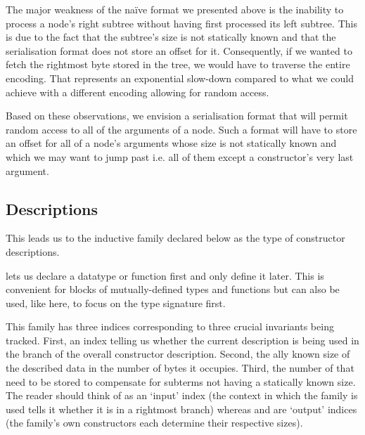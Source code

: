 The major weakness of the naïve format we presented above is the
inability to process a node's right subtree without having first
processed its left subtree.
%
This is due to the fact that the subtree's size is not statically
known and that the serialisation format does not store an offset
for it.
%
Consequently, if we wanted to fetch the rightmost byte stored
in the tree, we would have to traverse the entire encoding. That
represents an exponential slow-down compared to what we could achieve
with a different encoding allowing for random access.

Based on these observations, we envision a serialisation format
that will permit random access to all of the arguments of a node.
Such a format will have to store an offset for all of a node's
arguments whose size is not statically known and which we may want
to jump past i.e. all of them except a constructor's very last argument.

\subsection{Descriptions}

This leads us to the inductive family  declared below
as the type of constructor descriptions.


\begin{remark}
  \idris{} lets us declare a datatype or function first and only
  define it later. This is convenient for blocks of mutually-defined
  types and functions but can also be used, like here, to focus on
  the type signature first.
\end{remark}

This family has three indices corresponding to three crucial
invariants being tracked.
%
First, an index telling us whether the current description
is being used in the  branch of the overall
constructor description.
%
Second, the ally known size of the described data
in the number of bytes it occupies.
%
Third, the number of  that need to be stored to
compensate for subterms not having a statically known size.
%
The reader should think of  as an `input' index
(the context in which the family is used tells it whether it is in
a rightmost branch)
whereas  and  are `output' indices
(the family's own constructors each determine their respective sizes).

